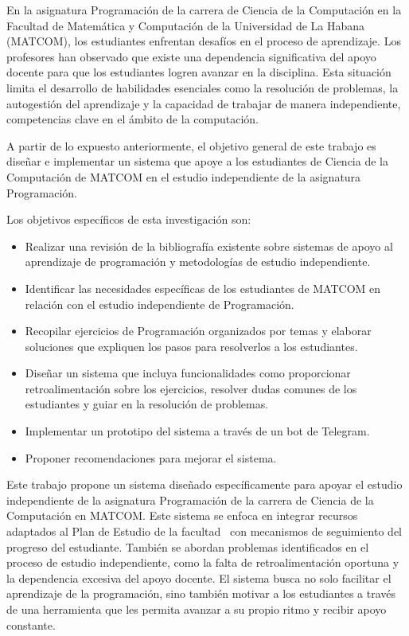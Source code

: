En la asignatura Programación de la carrera de Ciencia de la Computación en la Facultad de Matemática y Computación de la Universidad de La Habana (\mbox{MATCOM}), los estudiantes enfrentan desafíos en el proceso de aprendizaje. Los profesores han observado que existe una dependencia significativa del apoyo docente para que los estudiantes logren avanzar en la disciplina. Esta situación limita el desarrollo de habilidades esenciales como la resolución de problemas, la autogestión del aprendizaje y la capacidad de trabajar de manera independiente, competencias clave en el ámbito de la computación.

A partir de lo expuesto anteriormente, el objetivo general de este trabajo es diseñar e implementar un sistema que apoye a los estudiantes de Ciencia de la Computación de \mbox{MATCOM} en el estudio independiente de la asignatura Programación.

Los objetivos específicos de esta investigación son:
\begin{itemize}
    \item Realizar una revisión de la bibliografía existente sobre sistemas de apoyo al aprendizaje de programación y metodologías de estudio independiente.
    \item Identificar las necesidades específicas de los estudiantes de \mbox{MATCOM} en relación con el estudio independiente de Programación.
    \item Recopilar ejercicios de Programación organizados por temas y elaborar soluciones que expliquen los pasos para resolverlos a los estudiantes.
    \item Diseñar un sistema que incluya funcionalidades como proporcionar retroalimentación sobre los ejercicios, resolver dudas comunes de los estudiantes y guiar en la resolución de problemas.
    \item Implementar un prototipo del sistema a través de un bot de Telegram.
    \item Proponer recomendaciones para mejorar el sistema.
\end{itemize}

Este trabajo propone un sistema diseñado específicamente para apoyar el estudio independiente de la asignatura Programación de la carrera de Ciencia de la Computación en \mbox{MATCOM}. Este sistema se enfoca en integrar recursos adaptados al Plan de Estudio de la facultad~\cite{plan_estudio_e_2017} con mecanismos de seguimiento del progreso del estudiante. También se abordan problemas identificados en el proceso de estudio independiente, como la falta de retroalimentación oportuna y la dependencia excesiva del apoyo docente. El sistema busca no solo facilitar el aprendizaje de la programación, sino también motivar a los estudiantes a través de una herramienta que les permita avanzar a su propio ritmo y recibir apoyo constante.

